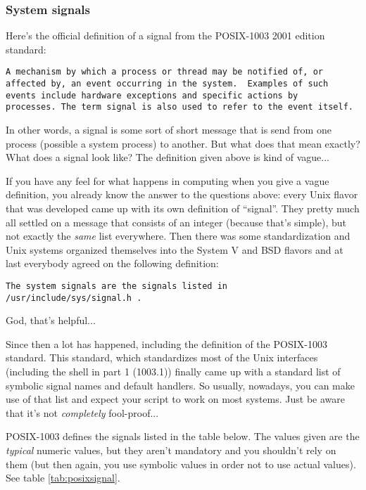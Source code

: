 \subsubsection{System signals}
Here's the official definition of a signal from the POSIX-1003 2001 edition
standard:

\scriptsize
\begin{verbatim}
A mechanism by which a process or thread may be notified of, or
affected by, an event occurring in the system.  Examples of such 
events include hardware exceptions and specific actions by 
processes. The term signal is also used to refer to the event itself.
\end{verbatim}
\normalsize

In other words, a signal is some sort of short message that is send from one
process (possible a system process) to another. But what does that mean
exactly? What does a signal look like? The definition given above is kind of
vague...

If you have any feel for what happens in computing when you give a vague
definition, you already know the answer to the questions above: every Unix
flavor that was developed came up with its own definition of ``signal''. They
pretty much all settled on a message that consists of an integer (because
that's simple), but not exactly the \emph{same} list everywhere. Then there was
some standardization and Unix systems organized themselves into the System V
and BSD flavors and at last everybody agreed on the following definition:

\scriptsize
\begin{verbatim}
The system signals are the signals listed in 
/usr/include/sys/signal.h .
\end{verbatim}
\normalsize

God, that's helpful...

Since then a lot has happened, including the definition of the POSIX-1003
standard. This standard, which standardizes most of the Unix interfaces
(including the shell in part 1 (1003.1)) finally came up with a standard list
of symbolic signal names and default handlers. So usually, nowadays, you can
make use of that list and expect your script to work on most systems. Just be
aware that it's not \emph{completely} fool-proof...

POSIX-1003 defines the signals listed in the table below. The values given are
the \emph{typical} numeric values, but they aren't mandatory and you shouldn't
rely on them (but then again, you use symbolic values in order not to use
actual values). See table \ref{tab:posixsignal}.

